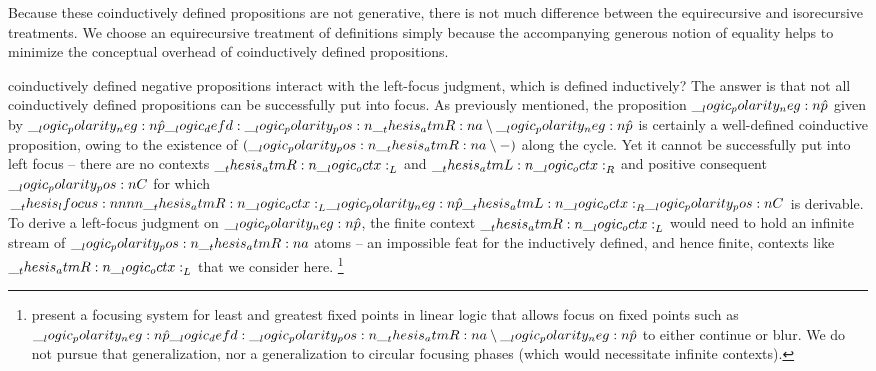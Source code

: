 Because these coinductively defined propositions are not generative, there is not much difference between the equirecursive and isorecursive treatments.\autocite{Amadio+Cardelli:TOPLAS93}
We choose an equirecursive treatment of definitions simply because the accompanying generous notion of equality helps to minimize the conceptual overhead of coinductively defined propositions.

 coinductively defined negative propositions interact with the left-focus judgment, which is defined inductively?
The answer is that not all coinductively defined propositions can be successfully put into focus.
As previously mentioned, the proposition $\__logic_polarity_neg:n {\hat{p}}$ given by $\__logic_polarity_neg:n {\hat{p}} \__logic_defd: \__logic_polarity_pos:n {\__thesis_atmR:n {a}} \mathbin { \setminus } \__logic_polarity_neg:n {\hat{p}}$ is certainly a well-defined coinductive proposition, owing to the existence of $(\__logic_polarity_pos:n {\__thesis_atmR:n {a}} \mathbin { \setminus } \mathord{-})$ along the cycle.
Yet it cannot be successfully put into left focus -- there are no contexts $\__thesis_atmR:n {\__logic_octx:}_L$ and $\__thesis_atmL:n {\__logic_octx:}_R$ and positive consequent $\__logic_polarity_pos:n {C}$ for which $\__thesis_lfocus:nnnn {\__thesis_atmR:n {\__logic_octx:}_L} {\__logic_polarity_neg:n {\hat{p}}} {\__thesis_atmL:n {\__logic_octx:}_R} {\__logic_polarity_pos:n {C}}$ is derivable.
To derive a left-focus judgment on $\__logic_polarity_neg:n {\hat{p}}$, the finite context $\__thesis_atmR:n {\__logic_octx:}_L$ would need to hold an infinite stream of $\__logic_polarity_pos:n {\__thesis_atmR:n {a}}$ atoms -- an impossible feat for the inductively defined, and hence finite, contexts like $\__thesis_atmR:n {\__logic_octx:}_L$ that we consider here.%
\footnote{%
  \Textcite{Baelde+Miller:LPAR07} present a focusing system for least and greatest fixed points in linear logic that allows focus on fixed points such as $\__logic_polarity_neg:n {\hat{p}} \__logic_defd: \__logic_polarity_pos:n {\__thesis_atmR:n {a}} \mathbin { \setminus } \__logic_polarity_neg:n {\hat{p}}$ to either continue or blur.
  We do not pursue that generalization, nor a generalization to circular focusing phases (which would necessitate infinite contexts).}


